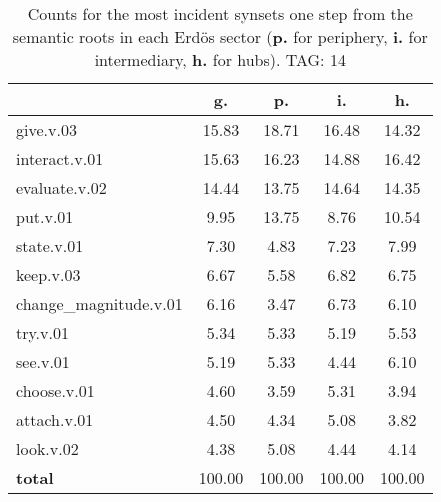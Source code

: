 \begin{table}[h!]
\begin{center}
\begin{tabular}{| l | c | c | c | c |}\hline
 & g. & p. & i. & h. \\\hline
give.v.03 & 15.83  & 18.71  & 16.48  & 14.32 \\\hline
interact.v.01 & 15.63  & 16.23  & 14.88  & 16.42 \\\hline
evaluate.v.02 & 14.44  & 13.75  & 14.64  & 14.35 \\\hline
put.v.01 & 9.95  & 13.75  & 8.76  & 10.54 \\\hline
state.v.01 & 7.30  & 4.83  & 7.23  & 7.99 \\\hline
keep.v.03 & 6.67  & 5.58  & 6.82  & 6.75 \\\hline
change\_magnitude.v.01 & 6.16  & 3.47  & 6.73  & 6.10 \\\hline
try.v.01 & 5.34  & 5.33  & 5.19  & 5.53 \\\hline
see.v.01 & 5.19  & 5.33  & 4.44  & 6.10 \\\hline
choose.v.01 & 4.60  & 3.59  & 5.31  & 3.94 \\\hline
attach.v.01 & 4.50  & 4.34  & 5.08  & 3.82 \\\hline
look.v.02 & 4.38  & 5.08  & 4.44  & 4.14 \\\hline
{{\bf total}} & 100.00  & 100.00  & 100.00  & 100.00 \\\hline
\end{tabular}
\caption{Counts for the most incident synsets one step from the semantic roots in each Erd\"os sector ({\bf p.} for periphery, {\bf i.} for intermediary, {\bf h.} for hubs). TAG: 14}
\end{center}
\end{table}